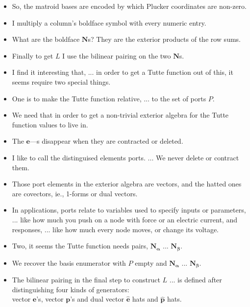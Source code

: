 \documentclass[14pt]{extarticle}
\begin{document}
{\begin{itemize}
\item
So, the matroid bases are encoded by which Plucker coordinates are non-zero.

\item
I multiply a column's boldface symbol with every numeric entry.

\item
  What are the boldface $\mathbf{N}$s?
  They are the exterior products of the row sums.

\item
  Finally to get $L$ I use the bilinear pairing on the two $\mathbf{N}$s.

\item
  I find it interesting that, ... in order to get a Tutte function out
  of this, it seems require two special things.

\item
One is to make the Tutte function relative, ... to the set of ports $P$.

\item
  We need that in order to get a non-trivial exterior algebra
  for the Tutte function values to live in.

\item The $\mathbf{e}$---s  disappear when they are contracted or deleted.

\item
  I like to call the distinguised elements ports. ... We never delete or contract them.

\item
  Those port elements in the exterior algebra are vectors, and the hatted
  ones are covectors, ie., 1-forms or dual vectors.

\item In applications, ports relate to variables used to specify inputs
  or parameters, ... like how much you push on a node with force or an electric current,
  and responses, ... like how much every node moves, or change its voltage.

\item
  Two, it seems the Tutte function needs pairs,
  $\mathbf{N_\alpha}$ ... $\mathbf{N_\beta}$.

\item
  We recover the basis enumerator with $P$ empty and
 $\mathbf{N_\alpha}$ ... $\mathbf{N_\beta}$.

\item
  The bilinear pairing in the final step to construct $L$ ... 
  is defined after distinguishing 
  four kinds of generators:\\
  vector $\mathbf{e}$'s, vector $\mathbf{p}$'s and
dual vector $\widehat{\mathbf{e}}$ hats and $\widehat{\mathbf{p}}$ hats.  


\end{itemize}}
\end{document}
